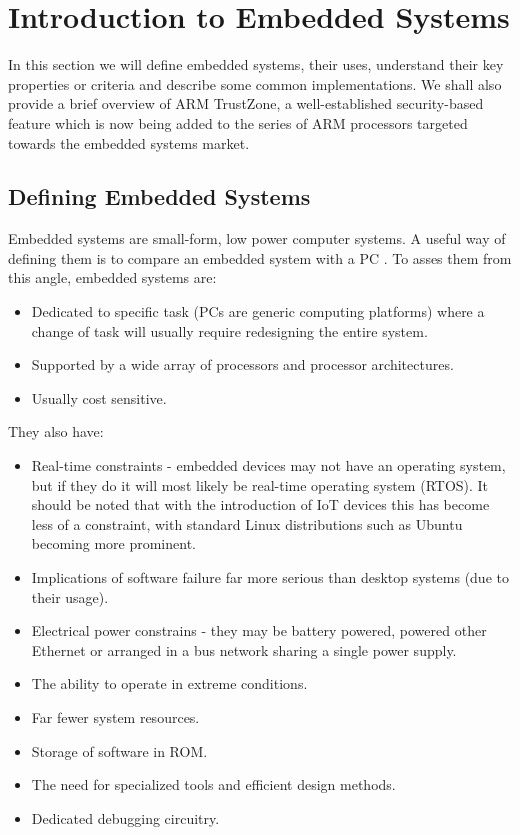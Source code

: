 \section{Introduction to Embedded Systems}

In this section we will define embedded systems, their uses, understand their key properties or criteria and describe some common implementations. We shall also provide a brief overview of ARM TrustZone, a well-established security-based feature which is now being added to the series of ARM processors targeted towards the embedded systems market.

\subsection{Defining Embedded Systems}

Embedded systems are small-form, low power computer systems. A useful way of defining them is to compare an embedded system with a PC \cite{BergerArnold2002Esd:}. To asses them from this angle, embedded systems are:
\begin{itemize}
\item Dedicated to specific task (PCs are generic computing platforms) where a change of task will usually require redesigning the entire system.
\item Supported by a wide array of processors and processor architectures.
\item Usually cost sensitive.
\end{itemize}
They also have:
\begin{itemize}
\item Real-time constraints - embedded devices may not have an operating system, but if they do it will most likely be real-time operating system (RTOS). It should be noted that with the introduction of IoT devices this has become less of a constraint, with standard Linux distributions such as Ubuntu becoming more prominent.
\item Implications of software failure far more serious than desktop systems (due to their usage).
\item Electrical power constrains - they may be battery powered, powered other Ethernet or arranged in a bus network sharing a single power supply.
\item The ability to operate in extreme conditions.
\item Far fewer system resources.
\item Storage of software in ROM.
\item The need for specialized tools and efficient design methods.
\item Dedicated debugging circuitry.
\end{itemize}

